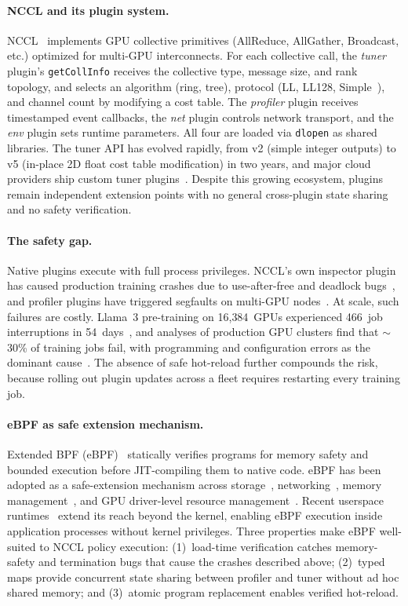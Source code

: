 \documentclass[sigplan,10pt]{acmart}
\begin{document}
\paragraph{NCCL and its plugin system.}
NCCL~\cite{nccl} implements GPU collective primitives (AllReduce,
AllGather, Broadcast, etc.) optimized for multi-GPU interconnects.
For each collective call, the \emph{tuner} plugin's
\texttt{getCollInfo} receives the collective type, message size, and
rank topology, and selects an algorithm (ring, tree), protocol (LL,
LL128, Simple~\cite{demystifying-nccl}), and channel count by
modifying a cost table. The \emph{profiler} plugin receives
timestamped event callbacks, the \emph{net} plugin controls network
transport, and the \emph{env} plugin sets runtime parameters. All
four are loaded via \texttt{dlopen} as shared libraries.
The tuner API has evolved rapidly, from v2 (simple integer outputs)
to v5 (in-place 2D float cost table modification) in two
years, and major cloud providers ship custom tuner
plugins~\cite{autoccl}. Despite this growing ecosystem, plugins
remain independent extension points with no general cross-plugin
state sharing and no safety verification.

\paragraph{The safety gap.}
Native plugins execute with full process privileges.
NCCL's own inspector plugin has caused production training crashes
due to use-after-free and deadlock bugs~\cite{nccl-inspector-bug},
and profiler plugins have triggered segfaults on multi-GPU
nodes~\cite{nccl-profiler-bug}. At scale, such failures are costly.
Llama~3 pre-training on 16{,}384~GPUs experienced 466~job
interruptions in 54~days~\cite{llama3}, and analyses of production
GPU clusters find that $\sim$30\% of training jobs fail, with
programming and configuration errors as the dominant
cause~\cite{philly}. The absence of safe hot-reload further
compounds the risk, because rolling out plugin updates across a fleet
requires restarting every training job.

\paragraph{eBPF as safe extension mechanism.}
Extended BPF (eBPF)~\cite{ebpf-linux} statically verifies programs
for memory safety and bounded execution before JIT-compiling them
to native code. eBPF has
been adopted as a safe-extension mechanism across
storage~\cite{xrp}, networking~\cite{electrode, etran}, memory
management~\cite{pageflex}, and GPU driver-level resource
management~\cite{gpu-ext}. Recent userspace
runtimes~\cite{bpftime} extend its reach beyond the kernel, enabling
eBPF execution inside application processes without kernel
privileges.
Three properties make eBPF well-suited to NCCL policy execution:
(1)~load-time verification catches memory-safety and termination bugs
that cause the crashes described above; (2)~typed maps provide
concurrent state sharing between profiler and tuner without ad hoc
shared memory; and (3)~atomic program replacement enables verified
hot-reload.
\end{document}
